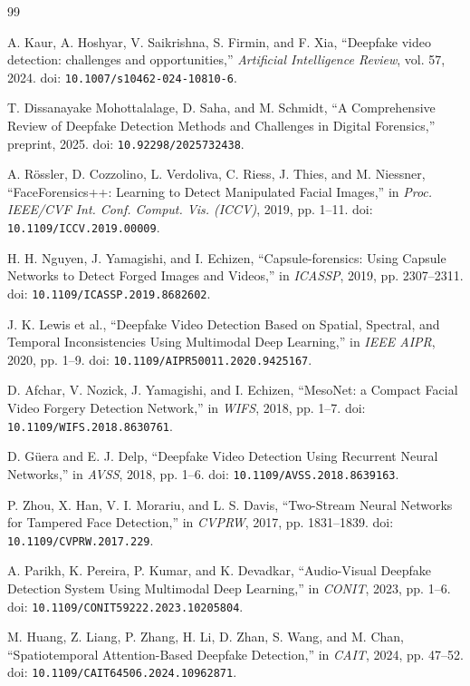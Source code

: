 \documentclass[conference]{IEEEtran}
\begin{document}
\begin{thebibliography}{99}

A. Kaur, A. Hoshyar, V. Saikrishna, S. Firmin, and F. Xia, ``Deepfake video detection: challenges and opportunities,'' \textit{Artificial Intelligence Review}, vol. 57, 2024. doi: \texttt{10.1007/s10462-024-10810-6}.


T. Dissanayake Mohottalalage, D. Saha, and M. Schmidt, ``A Comprehensive Review of Deepfake Detection Methods and Challenges in Digital Forensics,'' preprint, 2025. doi: \texttt{10.92298/2025732438}.

A. Rössler, D. Cozzolino, L. Verdoliva, C. Riess, J. Thies, and M. Niessner, ``FaceForensics++: Learning to Detect Manipulated Facial Images,'' in \textit{Proc. IEEE/CVF Int. Conf. Comput. Vis. (ICCV)}, 2019, pp. 1--11. doi: \texttt{10.1109/ICCV.2019.00009}.

H. H. Nguyen, J. Yamagishi, and I. Echizen, ``Capsule-forensics: Using Capsule Networks to Detect Forged Images and Videos,'' in \textit{ICASSP}, 2019, pp. 2307--2311. doi: \texttt{10.1109/ICASSP.2019.8682602}.

J. K. Lewis et al., ``Deepfake Video Detection Based on Spatial, Spectral, and Temporal Inconsistencies Using Multimodal Deep Learning,'' in \textit{IEEE AIPR}, 2020, pp. 1--9. doi: \texttt{10.1109/AIPR50011.2020.9425167}.

D. Afchar, V. Nozick, J. Yamagishi, and I. Echizen, ``MesoNet: a Compact Facial Video Forgery Detection Network,'' in \textit{WIFS}, 2018, pp. 1--7. doi: \texttt{10.1109/WIFS.2018.8630761}.

D. Güera and E. J. Delp, ``Deepfake Video Detection Using Recurrent Neural Networks,'' in \textit{AVSS}, 2018, pp. 1--6. doi: \texttt{10.1109/AVSS.2018.8639163}.

P. Zhou, X. Han, V. I. Morariu, and L. S. Davis, ``Two-Stream Neural Networks for Tampered Face Detection,'' in \textit{CVPRW}, 2017, pp. 1831--1839. doi: \texttt{10.1109/CVPRW.2017.229}.

A. Parikh, K. Pereira, P. Kumar, and K. Devadkar, ``Audio-Visual Deepfake Detection System Using Multimodal Deep Learning,'' in \textit{CONIT}, 2023, pp. 1--6. doi: \texttt{10.1109/CONIT59222.2023.10205804}.

M. Huang, Z. Liang, P. Zhang, H. Li, D. Zhan, S. Wang, and M. Chan, ``Spatiotemporal Attention-Based Deepfake Detection,'' in \textit{CAIT}, 2024, pp. 47--52. doi: \texttt{10.1109/CAIT64506.2024.10962871}.


\end{thebibliography}
\end{document}
